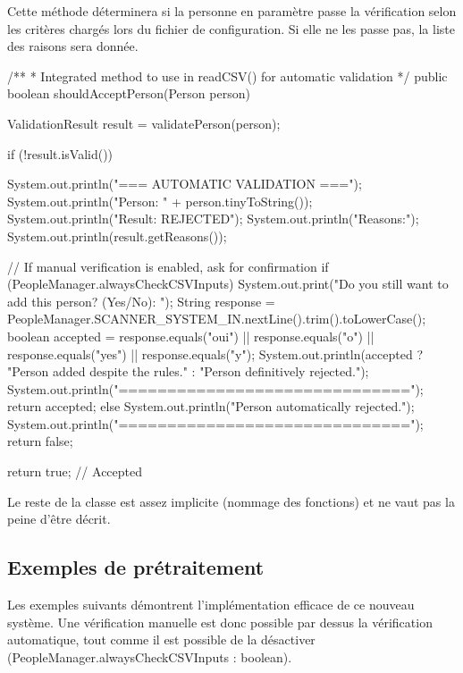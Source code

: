 \documentclass{mytex}
\begin{document}

Cette méthode déterminera si la personne en paramètre passe la vérification selon les critères chargés lors du fichier de configuration. Si elle ne les passe pas, la liste des raisons sera donnée.

\begin{codebox}
/**
* Integrated method to use in readCSV() for automatic validation
*/
public boolean shouldAcceptPerson(Person person) {
	ValidationResult result = validatePerson(person);
	
	if (!result.isValid()) {
		System.out.println("=== AUTOMATIC VALIDATION ===");
		System.out.println("Person: " + person.tinyToString());
		System.out.println("Result: REJECTED");
		System.out.println("Reasons:");
		System.out.println(result.getReasons());
		
		// If manual verification is enabled, ask for confirmation
		if (PeopleManager.alwaysCheckCSVInputs) {
			System.out.print("Do you still want to add this person? (Yes/No): ");
			String response = PeopleManager.SCANNER_SYSTEM_IN.nextLine().trim().toLowerCase();
			boolean accepted = response.equals("oui") || response.equals("o") || response.equals("yes") || response.equals("y");
			System.out.println(accepted ? "Person added despite the rules." : "Person definitively rejected.");
			System.out.println("==============================\n");
			return accepted;
		} else {
			System.out.println("Person automatically rejected.");
			System.out.println("==============================\n");
			return false;
		}
	}
	
	return true; // Accepted
}
\end{codebox}


Le reste de la classe est assez implicite (nommage des fonctions) et ne vaut pas la peine d'être décrit.

\subsection{Exemples de prétraitement}

Les exemples suivants démontrent l'implémentation efficace de ce nouveau système. Une vérification manuelle est donc possible par dessus la vérification automatique, tout comme il est possible de la désactiver (PeopleManager.alwaysCheckCSVInputs : boolean).

\end{document}
